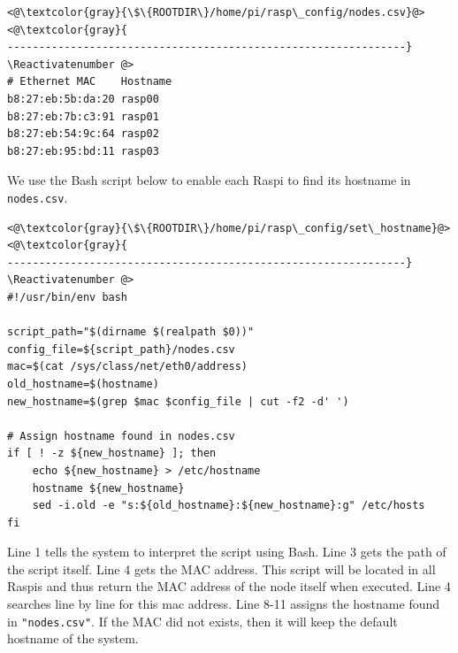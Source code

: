 

\Suppressnumber\begin{lstlisting}[]
<@\textcolor{gray}{\$\{ROOTDIR\}/home/pi/rasp\_config/nodes.csv}@>
<@\textcolor{gray}{
---------------------------------------------------------------}
\Reactivatenumber @>
# Ethernet MAC    Hostname
b8:27:eb:5b:da:20 rasp00
b8:27:eb:7b:c3:91 rasp01
b8:27:eb:54:9c:64 rasp02
b8:27:eb:95:bd:11 rasp03
\end{lstlisting}
\FloatBarrier
\vspace{-5mm}

We use the \ac{Bash} script below to enable each \ac{Raspi} to find its
hostname in \texttt{nodes.csv}.

\Suppressnumber\begin{lstlisting}[]
<@\textcolor{gray}{\$\{ROOTDIR\}/home/pi/rasp\_config/set\_hostname}@>
<@\textcolor{gray}{
---------------------------------------------------------------}
\Reactivatenumber @>
#!/usr/bin/env bash

script_path="$(dirname $(realpath $0))"
config_file=${script_path}/nodes.csv 
mac=$(cat /sys/class/net/eth0/address)
old_hostname=$(hostname)
new_hostname=$(grep $mac $config_file | cut -f2 -d' ')

# Assign hostname found in nodes.csv
if [ ! -z ${new_hostname} ]; then
    echo ${new_hostname} > /etc/hostname
    hostname ${new_hostname}
    sed -i.old -e "s:${old_hostname}:${new_hostname}:g" /etc/hosts
fi
\end{lstlisting}
\FloatBarrier
\vspace{-5mm}

Line 1 tells the system to interpret the script using Bash. Line 3 gets the
path of the script itself. Line 4 gets the MAC address. This script will be
located in all \ac{Raspi}s and thus return the MAC address of the node itself
when executed.
Line 4 searches line by line for this mac address.
Line 8-11 assigns the hostname found in \texttt{"nodes.csv"}. If the MAC did not exists,
then it will keep the default hostname of the system.

